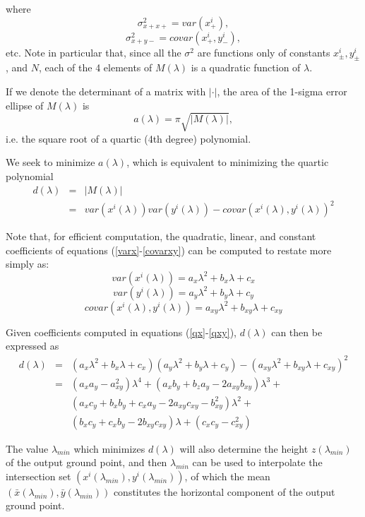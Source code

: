 \documentclass[10pt]{amsart}
\begin{document}
where
$$\sigma^2_{x+x+}=var(x^i_+),$$
$$\sigma^2_{x+y-}=covar(x^i_+, y^i_-),$$ 
etc. Note in particular that, since all the $\sigma^2$ are functions only of
constants $x^i_\pm, y^i_\pm$, and $N$, each of the 4 elements of $M(\lambda)$ is
a quadratic function of $\lambda$.

If we denote the determinant of a matrix with $|\cdot|$, the area of the
1-sigma error ellipse of $M(\lambda)$ is
$$a(\lambda) = \pi\sqrt{|M(\lambda)|},$$
i.e. the square root of a quartic (4th degree) polynomial.

We seek to minimize $a(\lambda)$, which is equivalent to minimizing
the quartic polynomial 
\begin{eqnarray*}
d(\lambda)&=&|M(\lambda)| \\
          &=&var(x^i(\lambda))var(y^i(\lambda)) - covar(x^i(\lambda),y^i(\lambda))^2
\end{eqnarray*}

Note that, for efficient computation, the quadratic, linear, and
constant coefficients of equations (\ref{varx}-\ref{covarxy}) can be
computed to restate more simply as:
\begin{equation}\label{qx}
var(x^i(\lambda)) = a_x\lambda^2 + b_x\lambda + c_x
\end{equation}
\begin{equation}\label{qy}
var(y^i(\lambda)) = a_y\lambda^2 + b_y\lambda + c_y
\end{equation}
\begin{equation}\label{qxy}
covar(x^i(\lambda),y^i(\lambda)) = a_{xy}\lambda^2 + b_{xy}\lambda + c_{xy}
\end{equation}

Given coefficients computed in equations (\ref{qx}-\ref{qxy}),
$d(\lambda)$ can then be expressed as
\begin{eqnarray}\label{d}
d(\lambda) &=& (a_x\lambda^2 + b_x\lambda + c_x)(a_y\lambda^2 + b_y\lambda + c_y) - 
(a_{xy}\lambda^2 + b_{xy}\lambda + c_{xy})^2 \nonumber \\
&=& (a_xa_y-a_{xy}^2)\lambda^4 + (a_xb_y+b_za_y-2a_{xy}b_{xy})\lambda^3 + \nonumber \\
&& (a_xc_y+b_xb_y+c_xa_y-2a_{xy}c_{xy}-b^2_{xy})\lambda^2 +\\
&& (b_xc_y+c_xb_y-2b_{xy}c_{xy})\lambda + (c_xc_y-c^2_{xy}) \nonumber
\end{eqnarray}

The value $\lambda_{min}$ which minimizes $d(\lambda)$ will also determine the
height $z(\lambda_{min})$ of the output ground point, and then $\lambda_{min}$
can be used to interpolate the intersection set
$(x^i(\lambda_{min}), y^i(\lambda_{min}))$, of which the mean
$(\bar{x}(\lambda_{min}), \bar{y}(\lambda_{min}))$ constitutes the horizontal
component of the output ground point.
\end{document}
